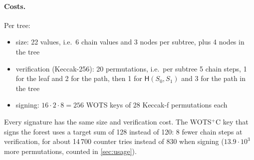 \documentclass[11pt]{article}
\newcommand{\hash}{\mathsf{H}}
\begin{document}
\paragraph{Costs.} Per tree:
\begin{itemize}
  \item size: 22 values, i.e.\ 6 chain values and 3 nodes per subtree, plus 4 nodes in the tree
  \item verification (Keccak-256): 20 permutations, i.e.\ per subtree 5 chain steps, 1 for the leaf and 2 for the path, then 1 for
        $\hash(S_0,S_1)$ and 3 for the path in the tree
  \item signing: $16\cdot2\cdot8 = 256$ WOTS keys of 28 Keccak-f permutations each
\end{itemize}
Every signature has the same size and verification cost. The WOTS$^+$C key that signs the forest uses a target sum
of 128 instead of 120: 8 fewer chain steps at verification, for about 14\,700 counter tries instead of 830 when
signing ($13.9\cdot10^3$ more permutations, counted in \cref{sec:usage}).
\end{document}
